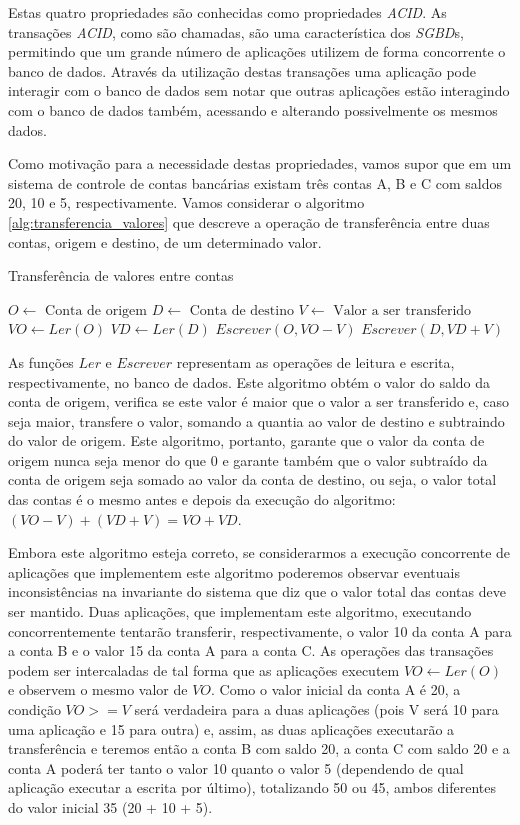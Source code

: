 \documentclass[11pt,twoside,a4paper]{book}
\begin{document}
Estas quatro propriedades são conhecidas como propriedades \emph{ACID}. As transações \emph{ACID}, como são chamadas, são uma característica dos \emph{SGBD}s, permitindo que um grande número de aplicações utilizem de forma concorrente o banco de dados. Através da utilização destas transações uma aplicação pode interagir com o banco de dados sem notar que outras aplicações estão interagindo com o banco de dados também, acessando e alterando possivelmente os mesmos dados.

Como motivação para a necessidade destas propriedades, vamos supor que em um sistema de controle de contas bancárias existam três contas A, B e C com saldos 20, 10 e 5, respectivamente. Vamos considerar o algoritmo \ref{alg:transferencia_valores} que descreve a operação de transferência entre duas contas, origem e destino, de um determinado valor.

\begin{algorithm}
\caption{Transferência de valores entre contas}
\label{alg:transferencia_valores}
\begin{algorithmic}[1]
\State $O \gets \text{ Conta de origem}$
\State $D \gets \text{ Conta de destino}$
\State $V \gets \text{ Valor a ser transferido}$
\State $VO \gets Ler(O)$
	\State $VD \gets Ler(D)$
	\State $Escrever(O, VO - V)$
	\State $Escrever(D, VD + V)$
\EndIf
\end{algorithmic}
\end{algorithm}

As funções $Ler$ e $Escrever$ representam as operações de leitura e escrita, respectivamente, no banco de dados. Este algoritmo obtém o valor do saldo da conta de origem, verifica se este valor é maior que o valor a ser transferido e, caso seja maior, transfere o valor, somando a quantia ao valor de destino e subtraindo do valor de origem. Este algoritmo, portanto, garante que o valor da conta de origem nunca seja menor do que 0 e garante também que o valor subtraído da conta de origem seja somado ao valor da conta de destino, ou seja, o valor total das contas é o mesmo antes e depois da execução do algoritmo: $(VO - V) + (VD + V) = VO + VD$.

Embora este algoritmo esteja correto, se considerarmos a execução concorrente de aplicações que implementem este algoritmo poderemos observar eventuais inconsistências na invariante do sistema que diz que o valor total das contas deve ser mantido. Duas aplicações, que implementam este algoritmo, executando concorrentemente tentarão transferir, respectivamente, o valor 10 da conta A para a conta B e o valor 15 da conta A para a conta C. As operações das transações podem ser intercaladas de tal forma que as aplicações executem $VO \gets Ler(O)$ e observem o mesmo valor de $VO$. Como o valor inicial da conta A é 20, a condição $VO >= V$ será verdadeira para a duas aplicações (pois V será 10 para uma aplicação e 15 para outra) e, assim, as duas aplicações executarão a transferência e teremos então a conta B com saldo 20, a conta C com saldo 20 e a conta A poderá ter tanto o valor 10 quanto o valor 5 (dependendo de qual aplicação executar a escrita por último), totalizando 50 ou 45, ambos diferentes do valor inicial 35 (20 + 10 + 5).
\end{document}
